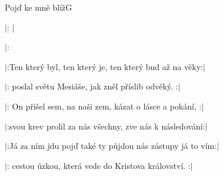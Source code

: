 \begin{song}{Pojď ke mně blíž}{G}{}

\begin{SBVerse}

$|$: $|$

$|$: 

\end{SBVerse}

\begin{SBVerse}

$|$:Ten který byl, ten který je, ten který bud až na věky:$|$

$|$: poslal světu Mesiáše, jak zněl příslib odvěký. :$|$

\end{SBVerse}

\begin{SBVerse}

$|$: On přišel sem, na naši zem, kázat o lásce a pokání, :$|$

$|$:svou krev prolil za nás všechny, zve nás k následování:$|$

\end{SBVerse}

\begin{SBVerse}

$|$:Já za ním jdu pojď také ty půjdou nás zástupy já to vím:$|$

$|$: cestou úzkou, která vede do Kristova království. :$|$

\end{SBVerse}

\end{song}
\pagebreak
